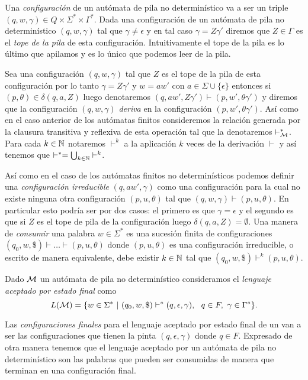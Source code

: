 \documentclass[tesis.tex]{subfiles}
\begin{document}
Una \emph{configuración} de un autómata de pila no determinístico va a ser un triple $(q,w,\gamma) \in Q \times \Sigma^* \times \Gamma^*$.
Dada una configuración de un autómata de pila no determinístico $(q,w, \gamma)$
tal que $\gamma \neq \epsilon$ y en tal caso $\gamma = Z \gamma'$ diremos que $Z \in \Gamma$ es el \emph{tope de la pila} de esta configuración.
Intuitivamente el tope de la pila es lo último que apilamos y es lo único que podemos leer de la pila.

Sea una configuración $(q,w,\gamma)$ tal que $Z$ es el tope de la pila de esta configuración por lo tanto $\gamma = Z \gamma'$ y $w = aw'$ con $a \in \Sigma \cup \{\epsilon\}$ 
entonces si $(p,\theta) \in \delta(q,a,Z)$ luego denotaremos $(q,aw', Z\gamma') \vdash (p,w',\theta\gamma')$ y diremos que la configuración $(q,w,\gamma)$ \emph{deriva} en la configuración $(p,w',\theta\gamma')$.
Así como en el caso anterior de los autómatas finitos consideremos la relación generada por la clausura transitiva y reflexiva de esta operación tal que la denotaremos $\vdash^*_{\cal M}$.
Para cada $k \in \mathbb{N}$ notaremos $\vdash^k$ a la aplicación $k$ veces de la derivación $\vdash$ y así tenemos que $\vdash^* = \bigcup_{k \in \mathbb{N}} \vdash^k$.


Así como en el caso de los autómatas finitos no determinísticos podemos definir una \emph{configuración irreducible} $(q,aw',\gamma)$ como una configuración para la cual no existe ninguna otra configuración $(p,u,\theta)$ tal que $(q,w,\gamma) \vdash (p,u,\theta)$.
En particular esto podría ser por dos casos: el primero es que $\gamma = \epsilon$ y el segundo es que si $Z$ es el tope de pila de la configuración luego $\delta(q,a,Z) = \emptyset$.
Una manera de \emph{consumir} una palabra $w \in \Sigma^*$ es una sucesión finita de configuraciones $(q_{0},w,\$) \vdash \dots \vdash (p,u,\theta)$ donde $(p,u,\theta)$ es una configuración irreducible, o escrito de manera equivalente, debe existir $k \in \mathbb{N}$ tal que $(q_{0},w,\$) \vdash^k (p,u,\theta)$.

\begin{deff}
	Dado $\cal M$ un autómata de pila no determinístico consideramos el \emph{lenguaje aceptado por estado final} como
	\begin{equation*}
		L( {\cal M}) = \{ w \in \Sigma^* \ | \ (q_0,w,\$) \vdash^* (q, \epsilon, \gamma), \ \ q \in F, \ \gamma \in \Gamma^*      \}.
	\end{equation*}
\end{deff}
Las \emph{configuraciones finales} para el lenguaje aceptado por estado final de un \APND van a ser las configuraciones que tienen la pinta $(q,\epsilon,\gamma)$ donde $q \in F$.
Expresado de otra manera tenemos que el lenguaje aceptado por un autómata de pila no determinístico son las palabras que pueden ser consumidas de manera que terminan en una configuración final.
\end{document}

